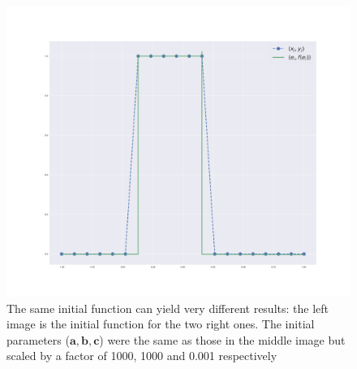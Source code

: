 \begin{figure}
    \includegraphics[width=\linewidth]{figures/same_init_different_func_square_1000.pdf}
    \endminipage
    
    \caption{The same initial function can yield very different results: the left image is the initial function for the two right ones. The initial parameters ($\bm a, \bm b, \bm c$) were the same as those in the middle image but scaled by a factor of 1000, 1000 and 0.001 respectively}
\end{figure}

